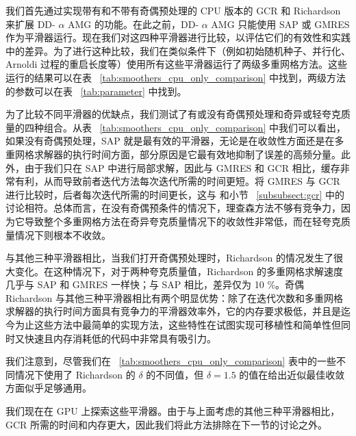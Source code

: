 \documentclass[5p,times,a4paper,fleqn]{cas-dc}
\begin{document}
我们首先通过实现带有和不带有奇偶预处理的 CPU 版本的 GCR 和 Richardson 来扩展 DD-   $\alpha$    AMG 的功能。在此之前，DD-   $\alpha$    AMG 只能使用 SAP 或 GMRES 作为平滑器运行。现在我们对这四种平滑器进行比较，以评估它们的有效性和实践中的差异。为了进行这种比较，我们在类似条件下（例如初始随机种子、并行化、Arnoldi 过程的重启长度等）使用所有这些平滑器运行了两级多重网格方法。这些运行的结果可以在表 \     \ref{tab:smoothers_cpu_only_comparison}    中找到，两级方法的参数可以在表 \     \ref{tab:parameter}    中找到。  

为了比较不同平滑器的优缺点，我们测试了有或没有奇偶预处理和奇异或轻夸克质量的四种组合。从表 \     \ref{tab:smoothers_cpu_only_comparison}    中我们可以看出，如果没有奇偶预处理，SAP 就是最有效的平滑器，无论是在收敛性方面还是在多重网格求解器的执行时间方面，部分原因是它最有效地抑制了误差的高频分量。此外，由于我们只在 SAP 中进行局部求解，因此与 GMRES 和 GCR 相比，缓存非常有利，从而导致前者迭代方法每次迭代所需的时间更短。将 GMRES 与 GCR 进行比较时，后者每次迭代所需的时间更长，这与    \cite{elman1982iterative}    和小节 \     \ref{subsubsect:gcr}    中的讨论相符。总体而言，在没有奇偶预条件的情况下，理查森方法不够有竞争力，因为它导致整个多重网格方法在奇异夸克质量情况下的收敛性非常低，而在轻夸克质量情况下则根本不收敛。  

与其他三种平滑器相比，当我们打开奇偶预处理时，Richardson 的情况发生了很大变化。在这种情况下，对于两种夸克质量值，Richardson 的多重网格求解速度几乎与 SAP 和 GMRES 一样快；与 SAP 相比，差异仅为 10 \%。奇偶 Richardson 与其他三种平滑器相比有两个明显优势：除了在迭代次数和多重网格求解器的执行时间方面具有竞争力的平滑器效率外，它的内存要求极低，并且是迄今为止这些方法中最简单的实现方法，这些特性在试图实现可移植性和简单性但同时又快速且内存消耗低的代码中非常具有吸引力。  

我们注意到，尽管我们在 \     \ref{tab:smoothers_cpu_only_comparison}    表中的一些不同情况下使用了 Richardson 的    $\delta$    的不同值，但    $\delta=1.5$    的值在给出近似最佳收敛方面似乎足够通用。  

我们现在在 GPU 上探索这些平滑器。由于与上面考虑的其他三种平滑器相比，GCR 所需的时间和内存更大，因此我们将此方法排除在下一节的讨论之外。  
\end{document}

